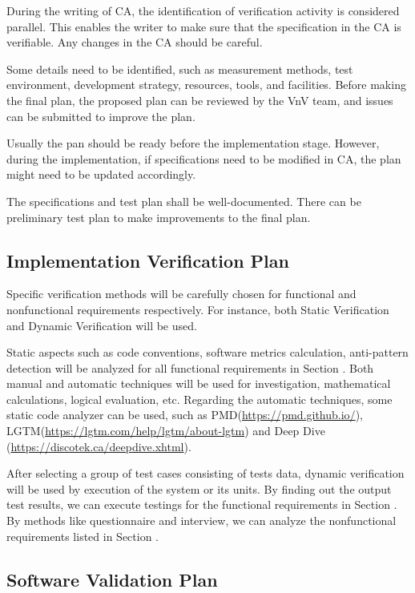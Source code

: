 \documentclass[12pt, titlepage]{article}
\begin{document}
During the writing of CA, the identification of verification activity is considered parallel. This enables the writer to make sure that the specification in the CA is verifiable. Any changes in the CA should be careful.

Some details need to be identified, such as measurement methods, test environment, development strategy, resources, tools, and facilities. Before making the final plan, the proposed plan can be reviewed by the VnV team, and issues can be submitted to improve the plan.

Usually the pan should be ready before the implementation stage. However, during the implementation, if specifications need to be modified in CA, the plan might need to be updated accordingly.

The specifications and test plan shall be well-documented. There can be preliminary test plan to make improvements to the final plan.

\subsection{Implementation Verification Plan}
    Specific verification methods will be carefully chosen for functional and nonfunctional requirements respectively. For instance, both Static Verification and Dynamic Verification will be used. 
    
    Static aspects such as code conventions, software metrics calculation, anti-pattern detection will be analyzed for all functional requirements in Section . Both manual and automatic techniques will be used for investigation, mathematical calculations, logical evaluation, etc. Regarding the automatic techniques, some static code analyzer can be used, such as PMD(\url{https://pmd.github.io/}), LGTM(\url{https://lgtm.com/help/lgtm/about-lgtm}) and Deep Dive (\url{https://discotek.ca/deepdive.xhtml}).
    
    After selecting a group of test cases consisting of tests data, dynamic verification will be used by execution of the system or its units. By finding out the output test results, we can execute testings for the functional requirements in Section . By methods like questionnaire and interview, we can analyze the nonfunctional requirements listed in Section .
        
\subsection{Software Validation Plan}
\end{document}
